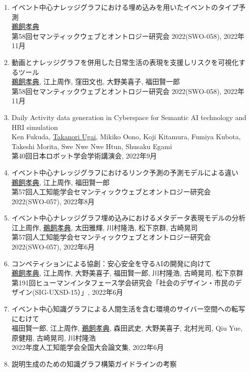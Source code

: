 \documentclass[dvipdfmx]{jlreq}
\begin{document}
\begin{enumerate}
\begin{enumerate}
\begin{enumerate}[label=\arabic*,align=right, labelsep=3pt]
第58回セマンティックウェブとオントロジー研究会 2022(SWO-058), 2022年11月
\item イベント中心ナレッジグラフにおける埋め込みを用いたイベントのタイプ予測\\
\underline{鵜飼孝典}\\
第58回セマンティックウェブとオントロジー研究会 2022(SWO-058), 2022年11月
\item 動画とナレッジグラフを併用した日常生活の表現を支援しリスクを可視化するツール\\
\underline{鵜飼孝典}, 江上周作, 窪田文也, 大野美喜子, 福田賢一郎\\
第58回セマンティックウェブとオントロジー研究会 2022(SWO-058), 2022年11月
\item Daily Activity data generation in Cyberspace for Semantic AI technology and HRI simulation\\
Ken Fukuda, \underline{Takanori Ugai}, Mikiko Oono, Koji Kitamura, Fumiya Kubota, Takeshi Morita, Swe Nwe Nwe Htun, Shusaku Egami\\
第40回日本ロボット学会学術講演会, 2022年9月
\item イベント中心ナレッジグラフにおけるリンク予測の予測モデルによる違い\\
\underline{鵜飼孝典}, 江上周作, 福田賢一郎\\
第57回人工知能学会セマンティックウェブとオントロジー研究会 2022(SWO-057), 2022年8月
\item イベント中心ナレッジグラフ埋め込みにおけるメタデータ表現モデルの分析\\
江上周作, \underline{鵜飼孝典}, 太田雅輝, 川村隆浩, 松下京群, 古崎晃司\\
第57回人工知能学会セマンティックウェブとオントロジー研究会 2022(SWO-057), 2022年6月
\item コンペティションによる協創：安心安全を守るAIの開発に向けて\\
\underline{鵜飼孝典}, 江上周作, 大野美喜子, 福田賢一郎, 川村隆浩, 古崎晃司, 松下京群\\
第191回ヒューマンインタフェース学会研究会「社会のデザイン・市民のデザイン(SIG-UXSD-15）」, 2022年6月
\item イベント中心知識グラフによる人間生活を含む環境のサイバー空間への転写にむけて\\
福田賢一郎, 江上周作, \underline{鵜飼孝典}, 森田武史, 大野美喜子, 北村光司, Qiu Yue, 原健翔, 古崎晃司, 川村隆浩\\
2022年度人工知能学会全国大会論文集, 2022年6月
\item 説明生成のための知識グラフ構築ガイドラインの考察\\

\end{enumerate}
\end{enumerate}
\end{enumerate}
\end{document}
